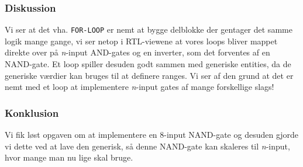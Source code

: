 {    



    \subsubsection{Diskussion}

    Vi ser at det vha. \texttt{FOR-LOOP} er nemt at bygge delblokke der gentager det samme logik mange gange, vi ser netop i RTL-viewene at vores loops bliver mappet direkte over på \textit{n}-input AND-gates og en inverter, som det forventes af en NAND-gate.
    Et loop spiller desuden godt sammen med generiske entities, da de generiske værdier kan bruges til at definere ranges.
    Vi ser af den grund at det er nemt med et loop at implementere \textit{n}-input gates af mange forskellige slags!

    \subsubsection{Konklusion}

    Vi fik løst opgaven om at implementere en 8-input NAND-gate og desuden gjorde vi dette ved at lave den generisk, så denne NAND-gate kan skaleres til \textit{n}-input, hvor mange man nu lige skal bruge.
}